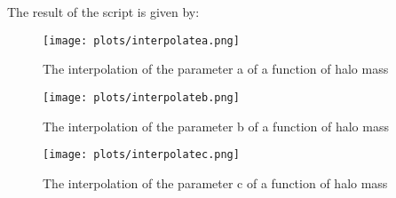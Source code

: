 

The result of the script is given by:


\begin{figure}[h]
   \centering
   \texttt{[image: plots/interpolatea.png]}
      \caption{The interpolation of the parameter a of a function of halo mass}
\end{figure}
\begin{figure}[h]
   \centering
   \texttt{[image: plots/interpolateb.png]}
      \caption{The interpolation of the parameter b of a function of halo mass}
\end{figure}
\begin{figure}[h]
   \centering
   \texttt{[image: plots/interpolatec.png]}
      \caption{The interpolation of the parameter c of a function of halo mass}
\end{figure}
